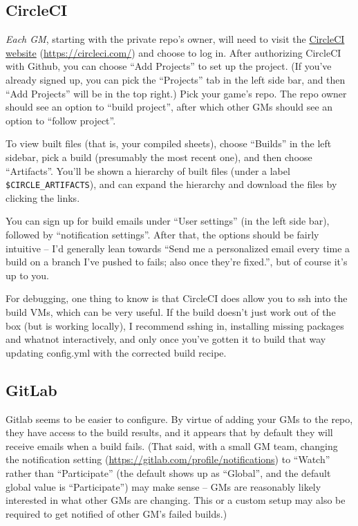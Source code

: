 \documentclass[green]{testgame}
\begin{document}
\subsection{CircleCI}

\emph{Each GM}, starting with the private repo's owner, will need to visit the \href{https://circleci.com/}{CircleCI website} (\url{https://circleci.com/}) and choose to log in. After authorizing CircleCI with Github, you can choose ``Add Projects'' to set up the project. (If you've already signed up, you can pick the ``Projects'' tab in the left side bar, and then ``Add Projects'' will be in the top right.) Pick your game's repo. The repo owner should see an option to ``build project'', after which other GMs should see an option to ``follow project''.

To view built files (that is, your compiled sheets), choose ``Builds'' in the left sidebar, pick a build (presumably the most recent one), and then choose ``Artifacts''. You'll be shown a hierarchy of built files (under a label \verb|$CIRCLE_ARTIFACTS|), and can expand the hierarchy and download the files by clicking the links.

You can sign up for build emails under ``User settings'' (in the left side bar), followed by ``notification settings''. After that, the options should be fairly intuitive -- I'd generally lean towards ``Send me a personalized email every time a build on a branch I've pushed to fails; also once they're fixed.'', but of course it's up to you.

For debugging, one thing to know is that CircleCI does allow you to ssh into the build VMs, which can be very useful. If the build doesn't just work out of the box (but is working locally), I recommend sshing in, installing missing packages and whatnot interactively, and only once you've gotten it to build that way updating config.yml with the corrected build recipe.

\subsection{GitLab}

Gitlab seems to be easier to configure. By virtue of adding your GMs to the repo, they have access to the build results, and it appears that by default they will receive emails when a build fails. (That said, with a small GM team, changing the notification setting (\url{https://gitlab.com/profile/notifications}) to ``Watch'' rather than ``Participate'' (the default shows up as ``Global'', and the default global value is ``Participate'') may make sense -- GMs are reasonably likely interested in what other GMs are changing. This or a custom setup may also be required to get notified of other GM's failed builds.)
\end{document}
